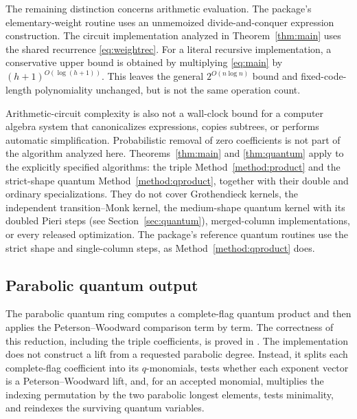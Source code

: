 \documentclass{amsart}
\theoremstyle{definition}
\theoremstyle{remark}
\numberwithin{equation}{section}
\begin{document}
The remaining distinction concerns arithmetic evaluation.
The package's elementary-weight routine uses an unmemoized
divide-and-conquer expression construction.
The circuit implementation analyzed in Theorem~\ref{thm:main} uses
the shared recurrence
\eqref{eq:weightrec}.
For a literal recursive implementation, a conservative upper bound
is obtained by multiplying \eqref{eq:main} by
$(h+1)^{O(\log(h+1))}$.
This leaves the general $2^{O(n\log n)}$ bound and fixed-code-length
polynomiality unchanged, but is not the same operation count.

Arithmetic-circuit complexity is also not a wall-clock bound for
a computer algebra system that canonicalizes expressions, copies
subtrees, or performs automatic simplification.
Probabilistic removal of zero coefficients is not part of the
algorithm analyzed here.
Theorems~\ref{thm:main} and \ref{thm:quantum} apply to the explicitly
specified algorithms: the triple Method~\ref{method:product} and the
strict-shape quantum Method~\ref{method:qproduct}, together with their
double and ordinary specializations.
They do not cover Grothendieck kernels, the independent transition--Monk
kernel, the medium-shape quantum kernel
with its doubled Pieri steps (see Section~\ref{sec:quantum}),
merged-column implementations, or every released optimization.
The package's reference quantum routines use the strict shape and
single-column steps, as Method~\ref{method:qproduct} does.

\subsection{Parabolic quantum output}

The parabolic quantum ring computes a complete-flag quantum product and
then applies the Peterson--Woodward comparison term by term. The
correctness of this reduction, including the triple coefficients, is
proved in \cite[Section~9]{samuelquantum}. The implementation does not
construct a lift from a requested parabolic degree. Instead, it splits
each complete-flag coefficient into its $q$-monomials, tests whether each
exponent vector is a Peterson--Woodward lift, and, for an accepted
monomial, multiplies the indexing permutation by the two parabolic
longest elements, tests minimality, and reindexes the surviving quantum
variables.
\end{document}
